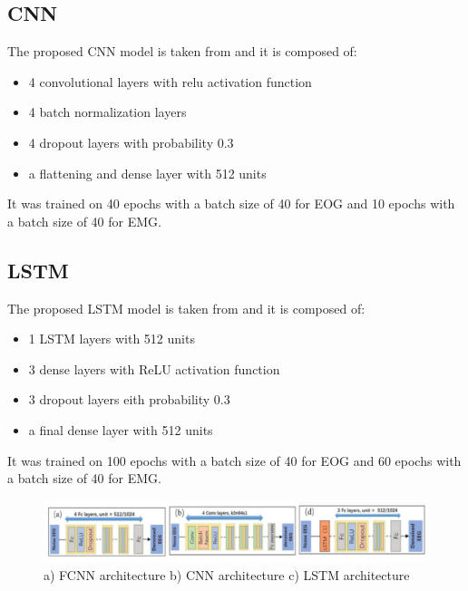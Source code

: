 \documentclass[a4paper, noexaminfo]{sapthesis}
\begin{document}
\subsection{CNN}\label{sec:model_cnn}
The proposed CNN model is taken from\cite{EEGdenoiseNet} and it is 
composed of: 
\begin{itemize}
\item 4 convolutional layers with relu activation function
\item 4 batch normalization layers
\item 4 dropout layers with probability 0.3
\item a flattening and dense layer with 512 units
\end{itemize}
It was trained on 40 epochs with a batch size of 40 for EOG and 
10 epochs with a batch size of 40 for EMG.
\subsection{LSTM}\label{sec:model_lstm}
The proposed LSTM model is taken from\cite{EEGdenoiseNet} and it is 
composed of: 
\begin{itemize}
\item 1 LSTM layers with 512 units
\item 3 dense layers with ReLU activation function
\item 3 dropout layers eith probability 0.3
\item a final dense layer with 512 units
\end{itemize}
It was trained on 100 epochs with a batch size of 40 for EOG and 
60 epochs with a batch size of 40 for EMG.
\begin{figure}[h!]
\centering
\includegraphics[width=1\linewidth]{images/models_architecture_basic.png}
\caption{a) FCNN architecture b) CNN architecture c) LSTM architecture}
\end{figure}
\end{document}
